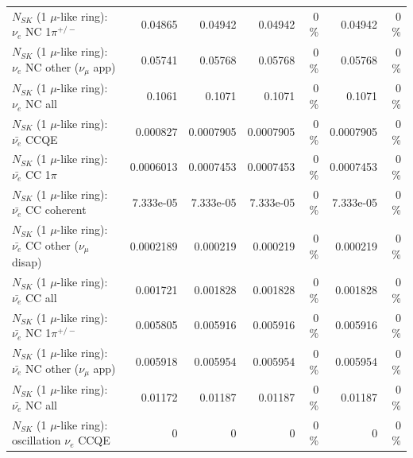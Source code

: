 \begin{table}
\begin{tabular}{| l | r | r | r  r | r  r |}
\hline
                           $N_{SK}$ (1 $\mu$-like ring): $\nu_e$ NC 1$\pi^{+/-}$ &         0.04865 &         0.04942 &         0.04942 &        0 \%  &         0.04942 &        0 \%  \\ 
                  $N_{SK}$ (1 $\mu$-like ring): $\nu_e$ NC other ($\nu_\mu$ app) &         0.05741 &         0.05768 &         0.05768 &        0 \%  &         0.05768 &        0 \%  \\ 
                                  $N_{SK}$ (1 $\mu$-like ring): $\nu_{e}$ NC all &          0.1061 &          0.1071 &          0.1071 &        0 \%  &          0.1071 &        0 \%  \\ 
\hline
\hline
\hline
                                $N_{SK}$ (1 $\mu$-like ring): $\bar{\nu_e}$ CCQE &        0.000827 &       0.0007905 &       0.0007905 &        0 \%  &       0.0007905 &        0 \%  \\ 
                           $N_{SK}$ (1 $\mu$-like ring): $\bar{\nu_e}$ CC 1$\pi$ &       0.0006013 &       0.0007453 &       0.0007453 &        0 \%  &       0.0007453 &        0 \%  \\ 
                         $N_{SK}$ (1 $\mu$-like ring): $\bar{\nu_e}$ CC coherent &       7.333e-05 &       7.333e-05 &       7.333e-05 &        0 \%  &       7.333e-05 &        0 \%  \\ 
          $N_{SK}$ (1 $\mu$-like ring): $\bar{\nu_e}$ CC other ($\nu_\mu$ disap) &       0.0002189 &        0.000219 &        0.000219 &        0 \%  &        0.000219 &        0 \%  \\ 
                            $N_{SK}$ (1 $\mu$-like ring): $\bar{\nu_{e}}$ CC all &        0.001721 &        0.001828 &        0.001828 &        0 \%  &        0.001828 &        0 \%  \\ 
\hline
                     $N_{SK}$ (1 $\mu$-like ring): $\bar{\nu_e}$ NC 1$\pi^{+/-}$ &        0.005805 &        0.005916 &        0.005916 &        0 \%  &        0.005916 &        0 \%  \\ 
            $N_{SK}$ (1 $\mu$-like ring): $\bar{\nu_e}$ NC other ($\nu_\mu$ app) &        0.005918 &        0.005954 &        0.005954 &        0 \%  &        0.005954 &        0 \%  \\ 
                            $N_{SK}$ (1 $\mu$-like ring): $\bar{\nu_{e}}$ NC all &         0.01172 &         0.01187 &         0.01187 &        0 \%  &         0.01187 &        0 \%  \\ 
\hline
\hline
\hline
                          $N_{SK}$ (1 $\mu$-like ring): oscillation $\nu_e$ CCQE &               0 &               0 &               0 &        0 \%  &               0 &        0 \%  \\ 

\end{tabular}
\end{table}
